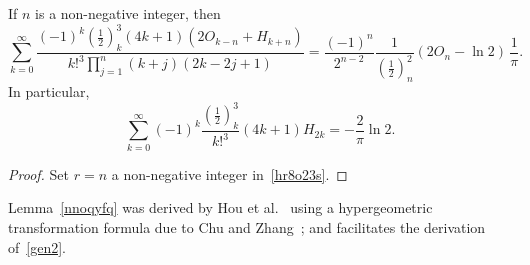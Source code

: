 \documentclass[12pt,reqno]{article}
\begin{document}
\begin{corollary}
If $n$ is a non-negative integer, then
\begin{equation*}
\sum_{k = 0}^\infty  {\frac{{( - 1)^k \left( {\frac{1}{2}} \right)_k^3 \left( {4k + 1} \right)\left( {2O_{k - n}  + H_{k + n} } \right)}}{{k!^3 \prod_{j = 1}^n {\left( {k + j} \right)\left( {2k - 2j + 1} \right)} }}}  = \frac{{( - 1)^n }}{{2^{n - 2} }}\frac{1}{{\left( {\frac{1}{2}} \right)_n^2 }}\left( {2O_n  - \ln 2} \right)\,\frac{1}{\pi }.
\end{equation*}
In particular,
\begin{equation*}
\sum_{k = 0}^\infty  {( - 1)^k \frac{{\left( {\frac{1}{2}} \right)_k^3 }}{{k!^3 }}\left( {4k + 1} \right)H_{2k} }  =  - \frac{2}{\pi }\ln 2.
\end{equation*}
\end{corollary}
\begin{proof}
Set $r=n$ a non-negative integer in~\eqref{hr8o23s}.
\end{proof}

Lemma~\ref{nnoqyfq} was derived by Hou et al.~\cite{hou24} using a hypergeometric transformation formula due to Chu and Zhang~\cite[Theorem 9]{chu14}; and facilitates the derivation of~\eqref{gen2}.
\end{document}
